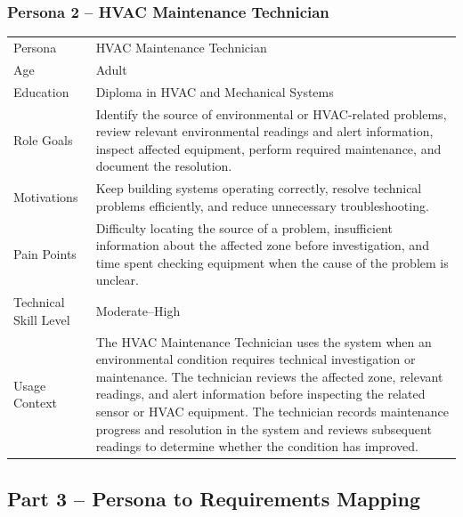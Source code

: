 \documentclass[11pt,a4paper]{article}
\begin{document}
\subsubsection*{Persona 2 -- HVAC Maintenance Technician}
\noindent\begin{minipage}{\linewidth}
\label{tab:p2}
{\small\stripe
\begin{tabularx}{\linewidth}{|B{3.6cm}|Y|}
\hline\headrow {} & \\\hline
Persona & HVAC Maintenance Technician\\\hline
Age & Adult\\\hline
Education & Diploma in HVAC and Mechanical Systems\\\hline
Role Goals & Identify the source of environmental or HVAC-related problems, review relevant environmental readings and alert information, inspect affected equipment, perform required maintenance, and document the resolution.\\\hline
Motivations & Keep building systems operating correctly, resolve technical problems efficiently, and reduce unnecessary troubleshooting.\\\hline
Pain Points & Difficulty locating the source of a problem, insufficient information about the affected zone before investigation, and time spent checking equipment when the cause of the problem is unclear.\\\hline
Technical Skill Level & Moderate--High\\\hline
Usage Context & The HVAC Maintenance Technician uses the system when an environmental condition requires technical investigation or maintenance. The technician reviews the affected zone, relevant readings, and alert information before inspecting the related sensor or HVAC equipment. The technician records maintenance progress and resolution in the system and reviews subsequent readings to determine whether the condition has improved.\\\hline
\end{tabularx}}
\end{minipage}
\medskip

\subsection*{Part 3 -- Persona to Requirements Mapping}
\end{document}
